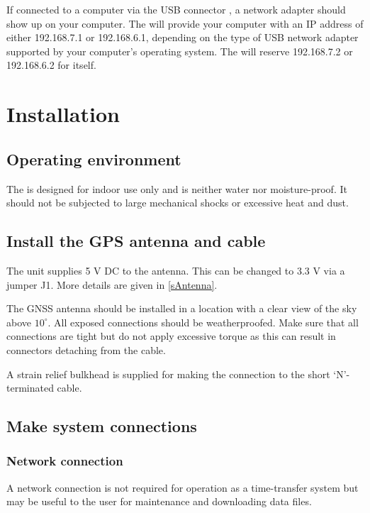 If connected to a computer via the USB connector , a network adapter should show up on your computer.
The \sysname{} will provide your computer with an IP address of either 192.168.7.1 or 192.168.6.1, depending on the type of USB network adapter
supported by your computer's operating system. The \sysname{} will reserve 192.168.7.2 or 192.168.6.2 for itself.


\section{Installation}

\subsection{Operating environment}

The \sysname{} is designed for indoor use only and is neither water nor moisture-proof.
It should not be subjected to large mechanical shocks or excessive heat and dust.

\subsection{Install the GPS antenna and cable}

The unit supplies 5 V DC to the antenna. This can be changed to 3.3 V via a jumper J1.
More details are given in \ref{sAntenna}.

The GNSS antenna should be installed in a location with a clear
view of the sky above $10^{\circ}$. All exposed connections should be
weatherproofed. Make sure that all connections are tight but do not apply
excessive torque as this can result in connectors detaching from the cable.

A strain relief bulkhead is supplied for making the connection to the short 
`N'-terminated cable. 

\subsection{Make system connections}



\subsubsection{Network connection}

A network connection is not required for operation as a time-transfer system
but may be useful to the user for maintenance and downloading data files. 

